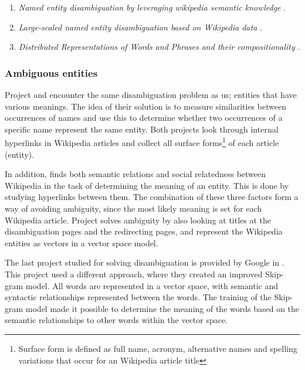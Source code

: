 \begin{enumerate}
\item \emph{Named entity disambiguation by leveraging wikipedia semantic knowledge} \cite{han2009named}. 
\item \emph{Large-scaled named entity disambiguation based on Wikipedia data} \cite{cucerzan2007large}. 
\item \emph{Distributed Representations of Words and Phrases and their compositionality} \cite{mikolov2013distributed}.
\end{enumerate}

\subsubsection{Ambiguous entities}
Project \cite{han2009named} and \cite{cucerzan2007large} encounter the same disambiguation problem as us; entities that have various meanings. The idea of their solution is to measure similarities between occurrences of names and use this to determine whether two occurrences of a specific name represent the same entity. Both projects look through internal hyperlinks in Wikipedia articles and collect all surface forms\footnote{Surface form is defined as full name, acronym, alternative names and spelling variations that occur for an Wikipedia article title} of each article (entity). 






In addition, \cite{cucerzan2007large} finds both semantic relations and social relatedness between Wikipedia in the task of determining the meaning of an entity. This is done by studying hyperlinks between them. The combination of these three factors form a way of avoiding ambiguity, since the most likely meaning is set for each Wikipedia article. 
Project \cite{han2009named} solves ambiguity by also looking at titles at the disambiguation pages and the redirecting pages, and represent the Wikipedia entities as vectors in a vector space model. 

The last project studied for solving disambiguation is provided by Google in \cite{mikolov2013distributed}. This project used a different approach, where they created an improved Skip-gram model. All words are represented in a vector space, with semantic and syntactic relationships represented between the words. The training of the Skip-gram model made it possible to determine the meaning of the words based on the semantic relationships to other words within the vector space. 

